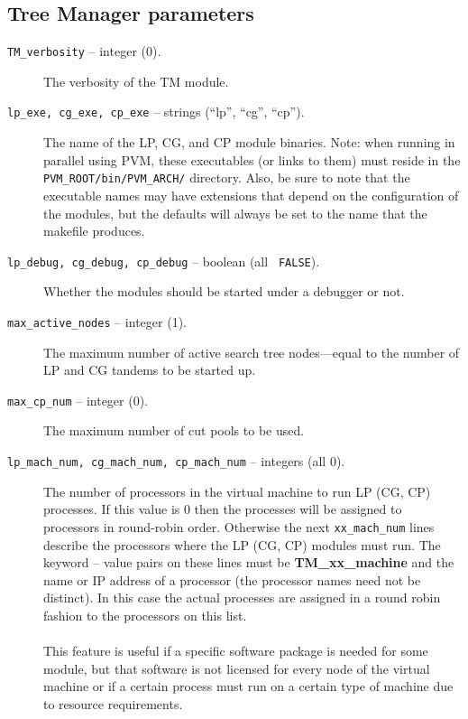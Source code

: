 \subsection{Tree Manager parameters}
\label{tm_params}
\begin{description}

\item[{\tt TM\_verbosity} -- integer (0).]
The verbosity of the TM module.

\item[{\tt lp\_exe, cg\_exe, cp\_exe} -- strings (``lp'', ``cg'',
``cp'').]
The name of the LP, CG, and CP module binaries. Note: when running in
parallel using PVM, these executables (or links to them) must reside
in the {\tt PVM\_ROOT/bin/PVM\_ARCH/} directory. Also, be sure to note
that the executable names may have extensions that depend on the
configuration of the modules, but the defaults will always be set to
the name that the makefile produces.

\item[{\tt lp\_debug, cg\_debug, cp\_debug} -- boolean (all {\tt
FALSE}).]
Whether the modules should be started under a debugger or not.

\item[{\tt max\_active\_nodes} -- integer (1).]
The maximum number of active search tree nodes---equal to the number of
LP and CG tandems to be started up.

\item[{\tt max\_cp\_num} -- integer (0).]
The maximum number of cut pools to be used.

\item[{\tt lp\_mach\_num, cg\_mach\_num, cp\_mach\_num} -- integers
(all 0).]
The number of processors in the virtual machine to run LP (CG, CP)
processes. If this value is 0 then the processes will be assigned to
processors in round-robin order. Otherwise the next {\tt xx\_mach\_num} lines
describe the processors where the LP (CG, CP) modules must run. The
keyword -- value pairs on these lines must be {\bf TM\_xx\_machine} and the
name or IP address of a processor (the processor names need not be distinct).
In this case the actual processes are assigned in a round robin fashion to the
processors on this list.\\
\\
This feature is useful if a specific software package is needed for
some module, but that software is not licensed for every node of the
virtual machine or if a certain process must run on a certain type of
machine due to resource requirements.


\end{description}
